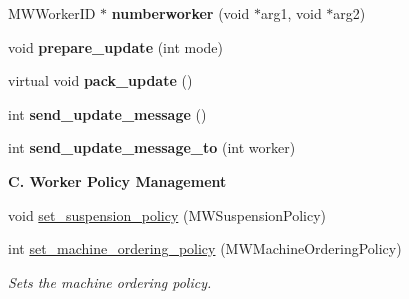 \begin{DoxyCompactItemize}
M\+W\+Worker\+ID $\ast$ {\bfseries numberworker} (void $\ast$arg1, void $\ast$arg2)
\item 
\mbox{\label{classMWDriver_afc9ed3676db0cc2ac5f5941beb15f1da}} 
void {\bfseries prepare\+\_\+update} (int mode)
\item 
\mbox{\label{classMWDriver_a8ac25d9fc7e9505bc14490d317c7560d}} 
virtual void {\bfseries pack\+\_\+update} ()
\item 
\mbox{\label{classMWDriver_a3a101f4b453675e7408ad9f3869a9804}} 
int {\bfseries send\+\_\+update\+\_\+message} ()
\item 
\mbox{\label{classMWDriver_ae13919ea92ecde1abc954db7ad0935d2}} 
int {\bfseries send\+\_\+update\+\_\+message\+\_\+to} (int worker)
\end{DoxyCompactItemize}
\begin{Indent}\textbf{ C. Worker Policy Management}\par
\begin{DoxyCompactItemize}
\item 
void \hyperlink{classMWDriver_a97b4b046a3793d45e28bd1b2fddbd8c1}{set\+\_\+suspension\+\_\+policy} (M\+W\+Suspension\+Policy)
\item 
\mbox{\label{classMWDriver_a390d85849e7f510369c3b81ec4312de7}} 
int \hyperlink{classMWDriver_a390d85849e7f510369c3b81ec4312de7}{set\+\_\+machine\+\_\+ordering\+\_\+policy} (M\+W\+Machine\+Ordering\+Policy)
\begin{DoxyCompactList}\small\item\em Sets the machine ordering policy. \end{DoxyCompactList}\end{DoxyCompactItemize}
\end{Indent}
